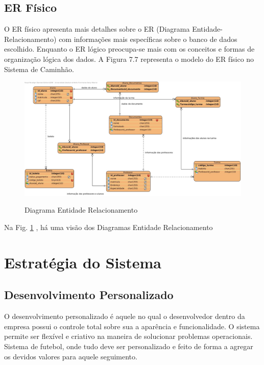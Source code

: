               

\subsection{ER Físico}
O ER físico apresenta mais detalhes sobre o ER (Diagrama Entidade-Relacionamento) com informações mais específicas sobre o banco de dados escolhido. Enquanto o ER lógico preocupa-se mais com os conceitos e formas de organização lógica dos dados. A Figura 7.7 representa o modelo do ER físico no Sistema de Caminhão.



       \begin{figure}[H]
                 \caption{Diagrama Entidade Relacionamento}
               \centering %
                \includegraphics[width=13cm]{analisedeProjeto/ERFisico} %
                \label{figura:ERFisico}
                \end{figure}
                Na Fig. \ref{figura:ERFisico} , há uma visão dos Diagramas Entidade Relacionamento

\section{Estratégia do Sistema}


\subsection{Desenvolvimento Personalizado}
 O desenvolvimento personalizado é aquele no qual o desenvolvedor dentro da empresa possui o controle total sobre sua a aparência e funcionalidade. 
 O sistema permite ser flexível e criativo na maneira de solucionar problemas operacionais.
 Sistema de futebol, onde tudo deve ser personalizado e feito de forma a agregar os devidos valores para aquele seguimento.

